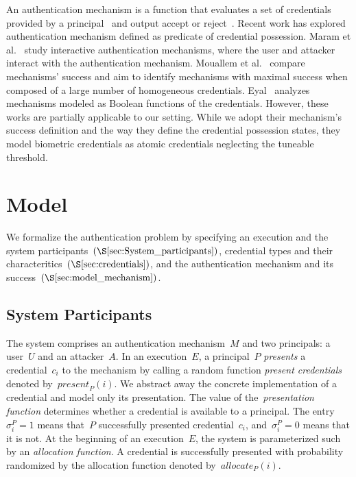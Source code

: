 \documentclass[conference,compsoc]{IEEEtran}
\begin{document}
An authentication mechanism is a function that evaluates a set of credentials provided by a principal~\cite{Abhishek2013} and output accept or reject~\cite{MattBishop2004,schneider_auth_people}. Recent work has explored authentication mechanism defined as predicate of credential possession. Maram et al.~\cite{maram2024} study interactive authentication mechanisms, where the user and attacker interact with the authentication mechanism. Mouallem et al.~\cite{mouallem2024} compare mechanisms' success and aim to identify mechanisms with maximal success when composed of a large number of homogeneous credentials. Eyal~\cite{Eyal2021} analyzes mechanisms modeled as Boolean functions of the credentials. However, these works are partially applicable to our setting. While we adopt their mechanism's success definition and the way they define the credential possession states, they model biometric credentials as atomic credentials neglecting the tuneable threshold.

\section{Model}\label{sec:model}
\noindent
We formalize the authentication problem by specifying an execution and the system participants~$(\S\ref{sec:System_participants})$, credential types and their characteritics~$(\S\ref{sec:credentials})$, and the authentication mechanism and its success~$(\S\ref{sec:model_mechanism})$.

\subsection{System Participants}\label{sec:System_participants}
\noindent
The system comprises an authentication mechanism~$M$ and two principals: a user~$U$ and an attacker~$A$. In an execution~$E$, a principal~$P$ \emph{presents} a credential~$c_i$ to the mechanism by calling a random function \emph{present credentials} denoted by~$\textit{present}_P(i)$. We abstract away the concrete implementation of a credential and model only its presentation. The value of the~\emph{presentation function} determines whether a credential is available to a principal. The entry~$\sigma_i^P=1$ means that~$P$ successfully presented credential~$c_i$, and~$\sigma_i^P=0$ means that it is not. At the beginning of an execution~$E$, the system is parameterized such by an \emph{allocation function}. A credential is successfully presented with probability randomized by the allocation function denoted by~$\textit{allocate}_P(i)$.
\end{document}
